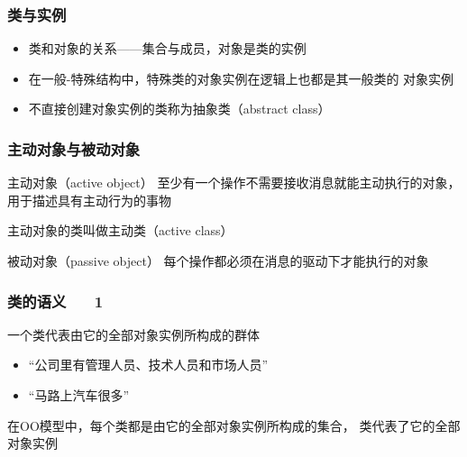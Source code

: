 \documentclass[compress]{beamer}
\begin{document}
  \begin{frame}
    \frametitle{类与实例}
    \begin{itemize}
      \item 类和对象的关系——集合与成员，对象是类的实例
      \item 在一般-特殊结构中，特殊类的对象实例在逻辑上也都是其一般类的
        对象实例
      \item 不直接创建对象实例的类称为\alert{抽象类}（abstract class） 
  \end{itemize}

  \centering{}
  \end{frame}

  \begin{frame}
    \frametitle{主动对象与被动对象}
    \begin{block}{主动对象（active object）}
      至少有一个操作不需要接收消息就能主动执行的对象，
    用于描述具有主动行为的事物

    主动对象的类叫做\alert{主动类}（active class）
  \end{block}

  \begin{block}{被动对象（passive object）}
   每个操作都必须在消息的驱动下才能执行的对象
 \end{block}

  \end{frame}

  \begin{frame}
    \frametitle{类的语义 ~~ 1 }

    一个类代表由它的全部对象实例所构成的群体
    \begin{example}
      \begin{itemize}
        \item “公司里有管理人员、技术人员和市场人员”
        \item “马路上汽车很多” 
      \end{itemize}
    \end{example}

    在OO模型中，每个类都是由它的全部对象实例所构成的集合，
    类代表了它的全部对象实例
  \end{frame}
\end{document}

